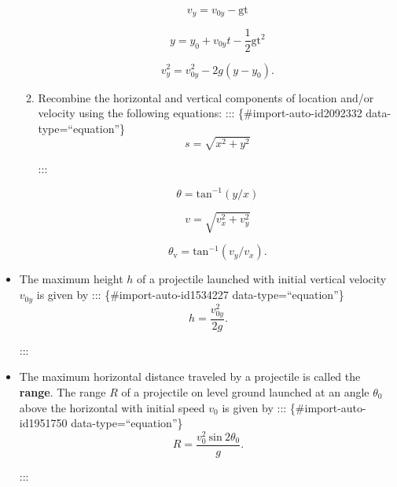 \documentclass[
]{book}
\begin{document}
\begin{itemize}
\begin{enumerate}
    \leavevmode\hypertarget{import-auto-id2022844}{}%
    \[{v_{y} = {v_{0y} - \text{gt}}}{}\]

    \leavevmode\hypertarget{import-auto-id1677876}{}%
    \[{{y = {y_{0} + v_{0y}}}{t - \frac{1}{2}}\text{gt}^{2}}{}\]

    \leavevmode\hypertarget{import-auto-id1653540}{}%
    \[{{v_{y}^{2} = {v_{0y}^{2} - 2g}}({y - y_{0}})}.{}\]
  \item
    \protect\hypertarget{import-auto-id1552181}{}{Recombine the horizontal and vertical components of location
    and/or velocity using the following
    equations:}
    ::: \{\#import-auto-id2092332 data-type=``equation''\}
    \[{s = \sqrt{x^{2} + y^{2}}}{}\]

    :::

    \leavevmode\hypertarget{import-auto-id2282348}{}%
    \[{{\theta = \text{tan}^{- 1}}({y/x})}{}\]

    \leavevmode\hypertarget{import-auto-id2274748}{}%
    \[{v = \sqrt{v_{x}^{2} + v_{y}^{2}}}{}\]

    \leavevmode\hypertarget{import-auto-id1979208}{}%
    \[{{\theta_{\text{v}} = \text{tan}^{- 1}}({v_{y}/v_{x}})}{}.\]
  \end{enumerate}
\item
  \protect\hypertarget{import-auto-id1888635}{}{The maximum height \(h{}\) of a projectile launched with initial
  vertical velocity \(v_{0y}{}\) is given by}
  ::: \{\#import-auto-id1534227 data-type=``equation''\}
  \[{h = \frac{v_{0y}^{2}}{2g}}{}.\]

  :::
\item
  \protect\hypertarget{import-auto-id1823593}{}{The maximum horizontal distance traveled by a projectile is called
  the \textbf{range}. The range \(R{}\) of a projectile on level ground
  launched at an angle \(\theta_{0}{}\) above the horizontal with
  initial speed \(v_{0}{}\) is given by}
  ::: \{\#import-auto-id1951750 data-type=``equation''\}
  \[{R = \frac{v_{0}^{2}\ \text{sin}\ {2\theta}_{0}}{g}}{}.\]

  :::
\end{itemize}
\end{document}
